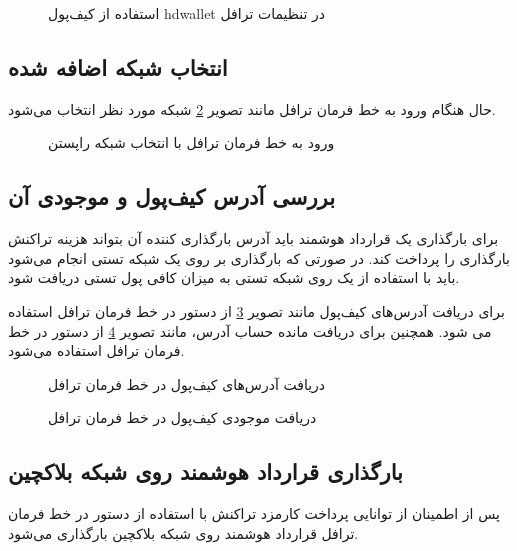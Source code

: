 \begin{figure}
\centerline{}
\caption{استفاده از کیف‌پول hdwallet در تنظیمات ترافل}
\label{fig:wallet-in-config}
\end{figure}


\subsection{انتخاب شبکه اضافه شده}
حال هنگام ورود به خط فرمان ترافل مانند تصویر
\ref{fig:truffle-console}
شبکه مورد نظر انتخاب می‌شود.

\begin{figure}
\centerline{}
\caption{ورود به خط فرمان ترافل با انتخاب شبکه راپستن}
\label{fig:truffle-console}
\end{figure}


\subsection{بررسی آدرس کیف‌پول و موجودی آن}
برای بارگذاری یک قرارداد هوشمند باید آدرس بارگذاری کننده آن بتواند هزینه تراکنش بارگذاری را پرداخت کند.
در صورتی که بارگذاری بر روی یک شبکه تستی انجام می‌شود باید با استفاده از یک
روی شبکه تستی به میزان کافی پول تستی دریافت شود.

برای دریافت آدرس‌های کیف‌پول مانند تصویر
\ref{fig:get-addresses}
از دستور
در خط فرمان ترافل استفاده می شود.
همچنین برای دریافت مانده حساب آدرس، مانند تصویر
\ref{fig:get-wallet-balance}
از دستور
در خط فرمان ترافل استفاده می‌شود.

\begin{figure}
\centerline{}
\caption{دریافت آدرس‌های کیف‌پول در خط فرمان ترافل}
\label{fig:get-addresses}
\end{figure}

\begin{figure}
\centerline{}
\caption{دریافت موجودی کیف‌پول در خط فرمان ترافل}
\label{fig:get-wallet-balance}
\end{figure}


\subsection{بارگذاری قرارداد هوشمند روی شبکه بلاکچین}
پس از اطمینان از توانایی پرداخت کارمزد تراکنش با استفاده از دستور
در خط فرمان ترافل قرارداد هوشمند روی شبکه بلاکچین بارگذاری می‌شود.


